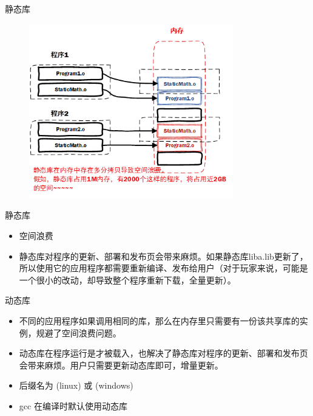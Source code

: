 \begin{frame}{静态库}
  \begin{figure}
    \centering
    \includegraphics[width=3.5in]{slide01/images/lib.png}
  \end{figure}
\end{frame}

\begin{frame}{静态库}
  \begin{free}[静态库的缺点]{}
    \begin{itemize}
    \item 空间浪费
    \item 静态库对程序的更新、部署和发布页会带来麻烦。如果静态库liba.lib更新了，所以使用它的应用程序都需要重新编译、发布给用户（对于玩家来说，可能是一个很小的改动，却导致整个程序重新下载，全量更新）。    
    \end{itemize}
  \end{free}
\end{frame}


\begin{frame}{动态库}
  \begin{free}[动态库的特点]{}
    \begin{itemize}
    \item 不同的应用程序如果调用相同的库，那么在内存里只需要有一份该共享库的实例，规避了空间浪费问题。 \\[.05in]
    \item 动态库在程序运行是才被载入，也解决了静态库对程序的更新、部署和发布页会带来麻烦。用户只需要更新动态库即可，增量更新。 \\[.05in]
    \item 后缀名为  (linux) 或  (windows) \\[0.05in]
    \item gcc 在编译时默认使用动态库
    \end{itemize}
  \end{free}

\end{frame}


